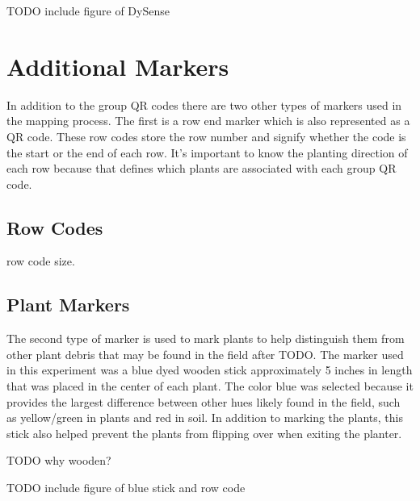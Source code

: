 TODO include figure of DySense

\section{Additional Markers}
\label{system-markers}

In addition to the group QR codes there are two other types of markers used in the mapping process.  The first is a row end marker which is also represented as a QR code.  These row codes store the row number and signify whether the code is the start or the end of each row.  It's important to know the planting direction of each row because that defines which plants are associated with each group QR code.   

\subsection{Row Codes}

row code size.

\subsection{Plant Markers}

The second type of marker is used to mark plants to help distinguish them from other plant debris that may be found in the field after TODO.  The marker used in this experiment was a blue dyed wooden stick approximately 5 inches in length that was placed in the center of each plant. The color blue was selected because it provides the largest difference between other hues likely found in the field, such as yellow/green in plants and red in soil.  In addition to marking the plants, this stick also helped prevent the plants from flipping over when exiting the planter.

TODO why wooden?

TODO include figure of blue stick and row code
